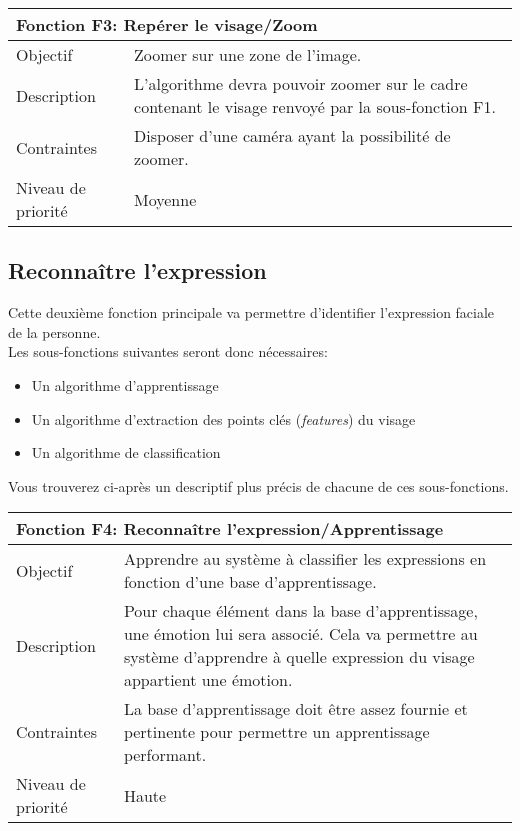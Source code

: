 \documentclass[poster]{polytech/polytech}
\begin{document}
\begin{tabular}{|l|p{12.5cm}|}
   \hline
   \multicolumn{2}{|l|}{\textbf{Fonction F3: Repérer le visage/Zoom}} \\
   \hline
   Objectif &Zoomer sur une zone de l'image. \\
   \hline
   Description &L'algorithme devra pouvoir zoomer sur le cadre contenant le visage renvoyé par la sous-fonction F1. \\
   \hline
   Contraintes &Disposer d'une caméra ayant la possibilité de zoomer. \\
   \hline
   Niveau de priorité &Moyenne \\
   \hline
\end{tabular}
\newpage
\subsection{Reconnaître l'expression}
Cette deuxième fonction principale va permettre d'identifier l'expression faciale de la personne.\\
Les sous-fonctions suivantes seront donc nécessaires:
\begin{itemize}
\item Un algorithme d'apprentissage
\item Un algorithme d'extraction des points clés (\textit{features}) du visage
\item Un algorithme de classification\\
\end{itemize}

Vous trouverez ci-après un descriptif plus précis de chacune de ces sous-fonctions.

\begin{tabular}{|l|p{12.5cm}|}
   \hline
   \multicolumn{2}{|l|}{\textbf{Fonction F4: Reconnaître l'expression/Apprentissage}} \\
   \hline
   Objectif &Apprendre au système à classifier les expressions en fonction d'une base d'apprentissage.\\
   \hline
   Description &Pour chaque élément dans la base d'apprentissage, une émotion lui sera associé. Cela va permettre au système d'apprendre à quelle expression du visage appartient une émotion.\\
   \hline
   Contraintes &La base d'apprentissage doit être assez fournie et pertinente pour permettre un apprentissage performant. \\
   \hline
   Niveau de priorité &Haute \\
   \hline
\end{tabular}
\end{document}
